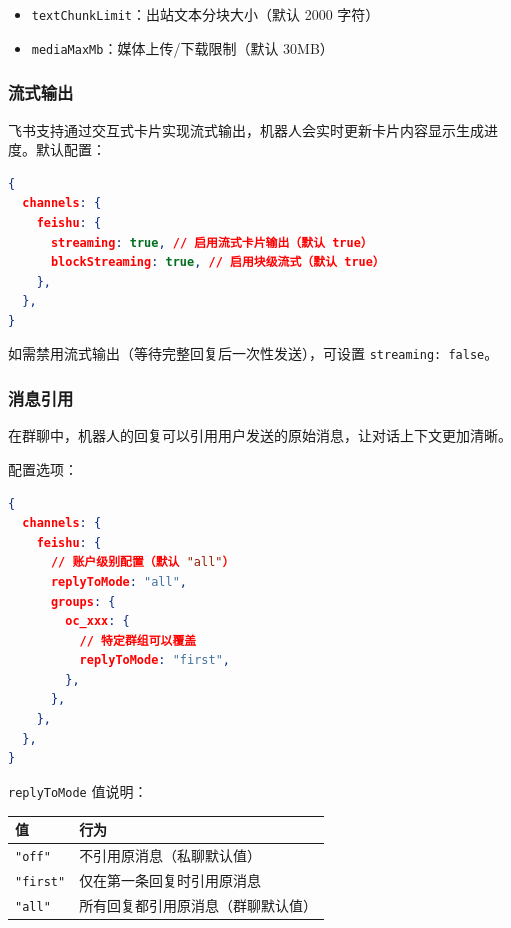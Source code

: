 \begin{itemize}
  \item \texttt{textChunkLimit}：出站文本分块大小（默认 2000 字符）
  \item \texttt{mediaMaxMb}：媒体上传/下载限制（默认 30MB）
\end{itemize}


\subsubsection{流式输出}


飞书支持通过交互式卡片实现流式输出，机器人会实时更新卡片内容显示生成进度。默认配置：

\begin{lstlisting}[language=json]
{
  channels: {
    feishu: {
      streaming: true, // 启用流式卡片输出（默认 true）
      blockStreaming: true, // 启用块级流式（默认 true）
    },
  },
}
\end{lstlisting}


如需禁用流式输出（等待完整回复后一次性发送），可设置 \texttt{streaming: false}。

\subsubsection{消息引用}


在群聊中，机器人的回复可以引用用户发送的原始消息，让对话上下文更加清晰。

配置选项：

\begin{lstlisting}[language=json]
{
  channels: {
    feishu: {
      // 账户级别配置（默认 "all"）
      replyToMode: "all",
      groups: {
        oc_xxx: {
          // 特定群组可以覆盖
          replyToMode: "first",
        },
      },
    },
  },
}
\end{lstlisting}


\texttt{replyToMode} 值说明：


\begin{table}[h]
\centering
\small
\begin{tabular}{|l|l|}
\hline
值 & 行为 \\
\hline
\texttt{"off"} & 不引用原消息（私聊默认值） \\
\hline
\texttt{"first"} & 仅在第一条回复时引用原消息 \\
\hline
\texttt{"all"} & 所有回复都引用原消息（群聊默认值） \\
\hline
\end{tabular}
\end{table}



